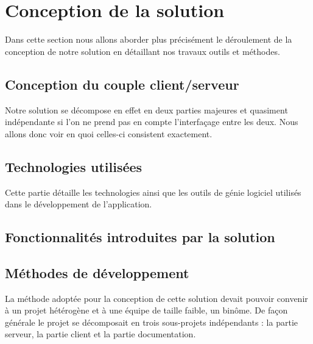 \section{Conception de la solution}

Dans cette section nous allons aborder plus précisément le déroulement de la conception de notre solution en détaillant nos travaux outils et méthodes.

\subsection{Conception du couple client/serveur}

Notre solution se décompose en effet en deux parties majeures et quasiment indépendante si l'on ne prend pas en compte l'interfaçage entre les deux. Nous allons donc voir en quoi celles-ci consistent exactement.

    

    

\subsection{Technologies utilisées}

Cette partie détaille les technologies ainsi que les outils de génie logiciel utilisés dans le développement de l’application.

    

    

    

\subsection{Fonctionnalités introduites par la solution}

    
    
    

\subsection{Méthodes de développement}

La méthode adoptée pour la conception de cette solution devait pouvoir convenir à un projet hétérogène et à une équipe de taille faible, un binôme. De façon générale le projet se décomposait en trois sous-projets indépendants : la partie serveur, la partie client et la partie documentation.


